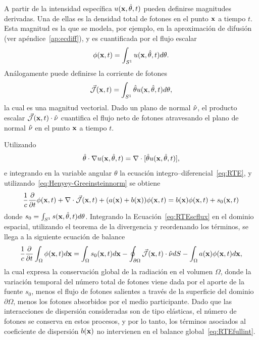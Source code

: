 A partir de la intensidad específica $u(\mathbf{x},\hat{\theta},t)$ pueden definirse magnitudes derivadas. 
Una de ellas es la densidad total de fotones 
en el punto $\mathbf{x}$ a tiempo $t$. Esta magnitud es la que se modela, por ejemplo, 
en la aproximación de difusión (ver apéndice~\ref{ap:ecdiff}), y es cuantificada por el flujo escalar
\begin{equation}
  \phi(\mathbf{x},t)=\int_{S^1} u(\mathbf{x},\hat{\theta},t) d\theta.
\label{eq:photondensity}
\end{equation}
Análogamente puede definirse la corriente de fotones 
\begin{equation}
 \vec{ \mathcal{J}}(\mathbf{x},t)=\int_{S^1} \hat{\theta} u(\mathbf{x},\hat{\theta},t) d\theta,
\label{eq:photoncurrent}
\end{equation}
la cual es una magnitud vectorial. Dado un plano de normal $\hat{\nu}$, 
el producto escalar $\vec{ \mathcal{J}}(\mathbf{x},t) \cdot \hat{\nu}$ 
cuantifica el flujo neto de fotones atravesando el plano de normal $ \hat{\nu}$ 
en el punto $\mathbf{x}$ a tiempo $t$.

Utilizando
\begin{equation}
\hat{\theta} \cdot \nabla u(\mathbf{x},\hat{\theta},t)=\nabla \cdot [\hat{\theta} u(\mathbf{x},\hat{\theta},t)],
\label{eq:scdiv}
\end{equation}
e integrando en la variable angular $\theta$
 la ecuación integro--diferencial~\eqref{eq:RTE}, y utilizando~\eqref{eq:Henyey-Greeinsteinnorm}  se obtiene
\begin{equation}
\frac{1}{c}\frac{\partial}{\partial t} \phi(\mathbf{x},t)+\nabla \cdot \vec{ \mathcal{J}}(\mathbf{x},t)
+(a(\mathbf{x})+b(\mathbf{x})) \phi(\mathbf{x},t)=b(\mathbf{x})\phi(\mathbf{x},t)+s_0(\mathbf{x},t)
\label{eq:RTEscflux}
\end{equation}
donde $s_0=\int_{S^1}s(\mathbf{x},\hat{\theta},t)d\theta$. Integrando la 
Ecuación~\eqref{eq:RTEscflux} en el dominio espacial, utilizando el teorema de la divergencia
y reordenando los términos, se llega a la siguiente ecuación de balance
\begin{equation}
\frac{1}{c}\frac{\partial}{\partial t} \int_{\Omega}\phi(\mathbf{x},t)d\mathbf{x} = 
\int_{\Omega}s_0(\mathbf{x},t)d\mathbf{x}- \oint_{\partial \Omega} \vec{ \mathcal{J}}(\mathbf{x},t)\cdot \hat{\nu} dS-\int_{\Omega}a(\mathbf{x})\phi(\mathbf{x},t)d\mathbf{x},
\label{eq:RTEfullint}
\end{equation}
la cual expresa la conservación global de la radiación en el volumen $\Omega$, 
donde la variación temporal del número total de fotones 
viene dada por el aporte de la fuente $s_0$, menos el flujo de fotones salientes 
 a través de la superficie del 
dominio $\partial \Omega$, menos los fotones absorbidos 
por el medio participante. 
Dado que las interacciones de dispersión consideradas son de tipo elásticas, el número 
de fotones se conserva en estos procesos, y por lo tanto, los términos asociados 
al coeficiente de dispersión $b(\mathbf{x})$ no intervienen en el balance global~\eqref{eq:RTEfullint}. 

